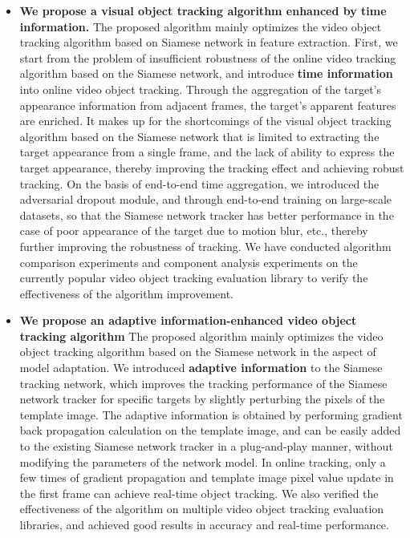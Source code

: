 \begin{itemize}
\item{\textbf{We propose a visual object tracking algorithm enhanced by time information.} The proposed algorithm mainly optimizes the video object tracking algorithm based on Siamese network in feature extraction. First, we start from the problem of insufficient robustness of the online video tracking algorithm based on the Siamese network, and introduce \textbf{time information} into online video object tracking. Through the aggregation of the target's appearance information from adjacent frames, the target's apparent features are enriched. It makes up for the shortcomings of the visual object tracking algorithm based on the Siamese network that is limited to extracting the target appearance from a single frame, and the lack of ability to express the target appearance, thereby improving the tracking effect and achieving robust tracking. On the basis of end-to-end time aggregation, we introduced the adversarial dropout module, and through end-to-end training on large-scale datasets, so that the Siamese network tracker has better performance in the case of poor appearance of the target due to motion blur, etc., thereby further improving the robustness of tracking. We have conducted algorithm comparison experiments and component analysis experiments on the currently popular video object tracking evaluation library to verify the effectiveness of the algorithm improvement.}

\item{\textbf{We propose an adaptive information-enhanced video object tracking algorithm} The proposed algorithm mainly optimizes the video object tracking algorithm based on the Siamese network in the aspect of model adaptation. We introduced \textbf{adaptive information} to the Siamese tracking network, which improves the tracking performance of the Siamese network tracker for specific targets by slightly perturbing the pixels of the template image. The adaptive information is obtained by performing gradient back propagation calculation on the template image, and can be easily added to the existing Siamese network tracker in a plug-and-play manner, without modifying the parameters of the network model. In online tracking, only a few times of gradient propagation and template image pixel value update in the first frame can achieve real-time object tracking. We also verified the effectiveness of the algorithm on multiple video object tracking evaluation libraries, and achieved good results in accuracy and real-time performance.}


\end{itemize}
